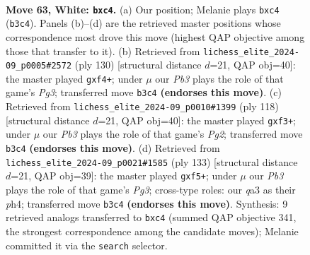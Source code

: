 \documentclass[11pt]{article}
\begin{document}
\clearpage

\begin{figure}[p]\centering
\begin{subfigure}{0.46\textwidth}\centering
\resizebox{\linewidth}{!}{%
\newchessgame
\chessboard[
  setfen={8/p5k1/1p6/8/P1p5/qP6/4K3/8 w - - 0 63},
  showmover=false,
  pgfstyle=straightmove, color=movearrow, markmove={b3-c4}
]}
\caption{}
\end{subfigure}\hfill
\begin{subfigure}{0.46\textwidth}\centering
\resizebox{\linewidth}{!}{%
\newchessgame
\chessboard[
  setfen={8/8/8/4k2p/5p1P/6P1/4K3/8 w - - 0 66},
  showmover=false,
  pgfstyle=straightmove, color=movearrow, markmove={g3-f4}
]}
\caption{}
\end{subfigure}
\\[4pt]
\begin{subfigure}{0.46\textwidth}\centering
\resizebox{\linewidth}{!}{%
\newchessgame
\chessboard[
  setfen={8/8/8/8/4k2p/5p1P/6P1/3K4 w - - 0 60},
  showmover=false,
  pgfstyle=straightmove, color=movearrow, markmove={g2-f3}
]}
\caption{}
\end{subfigure}\hfill
\begin{subfigure}{0.46\textwidth}\centering
\resizebox{\linewidth}{!}{%
\newchessgame
\chessboard[
  setfen={8/8/p5p1/5P1p/P3K2P/6k1/2n5/8 b - - 0 67},
  showmover=false,
  pgfstyle=straightmove, color=movearrow, markmove={g6-f5}
]}
\caption{}
\end{subfigure}
\caption{\textbf{Move 63, White: \texttt{bxc4}.} (a) Our position; Melanie plays \texttt{bxc4} (\texttt{b3c4}). Panels (b)--(d) are the retrieved master positions whose correspondence most drove this move (highest QAP objective among those that transfer to it). (b) Retrieved from \texttt{lichess\_elite\_2024-09\_p0005\#2572} (ply 130) [structural distance $d$=21, QAP obj=40]: the master played \texttt{gxf4+}; under $\mu$ our \emph{Pb3} plays the role of that game's \emph{Pg3}; transferred move \texttt{b3c4} \textbf{(endorses this move)}. (c) Retrieved from \texttt{lichess\_elite\_2024-09\_p0010\#1399} (ply 118) [structural distance $d$=21, QAP obj=40]: the master played \texttt{gxf3+}; under $\mu$ our \emph{Pb3} plays the role of that game's \emph{Pg2}; transferred move \texttt{b3c4} \textbf{(endorses this move)}. (d) Retrieved from \texttt{lichess\_elite\_2024-09\_p0021\#1585} (ply 133) [structural distance $d$=21, QAP obj=39]: the master played \texttt{gxf5+}; under $\mu$ our \emph{Pb3} plays the role of that game's \emph{Pg3}; cross-type roles: our \emph{q}a3 as their \emph{p}h4; transferred move \texttt{b3c4} \textbf{(endorses this move)}. Synthesis: 9 retrieved analogs transferred to \texttt{bxc4} (summed QAP objective 341, the strongest correspondence among the candidate moves); Melanie committed it via the \texttt{search} selector.}
\label{fig:thought-m124}
\end{figure}
\end{document}

